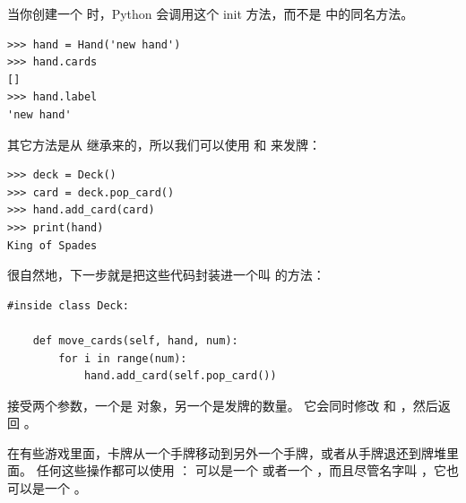 
当你创建一个  时，Python 会调用这个 init 方法，而不是  中的同名方法。

\begin{lstlisting}
>>> hand = Hand('new hand')
>>> hand.cards
[]
>>> hand.label
'new hand'
\end{lstlisting}


其它方法是从  继承来的，所以我们可以使用  和 
 来发牌：

\begin{lstlisting}
>>> deck = Deck()
>>> card = deck.pop_card()
>>> hand.add_card(card)
>>> print(hand)
King of Spades
\end{lstlisting}


很自然地，下一步就是把这些代码封装进一个叫  的方法：


\begin{lstlisting}
#inside class Deck:

    def move_cards(self, hand, num):
        for i in range(num):
            hand.add_card(self.pop_card())
\end{lstlisting}


 接受两个参数，一个是  对象，另一个是发牌的数量。
它会同时修改  和  ，然后返回  。


在有些游戏里面，卡牌从一个手牌移动到另外一个手牌，或者从手牌退还到牌堆里面。
任何这些操作都可以使用  ：  可以是一个  或者一个  ，而且尽管名字叫  ，它也可以是一个  。

